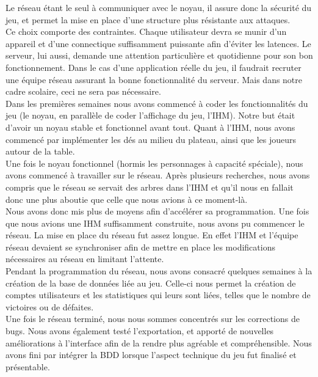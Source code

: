\documentclass[a4paper,11pt]{article}
\begin{document}
\newpage

Le réseau étant le seul à communiquer avec le noyau, il assure donc la sécurité du jeu, et permet la mise en place d’une structure plus résistante aux attaques. \\

Ce choix comporte des contraintes. Chaque utilisateur devra se munir d’un appareil et d’une connectique suffisamment puissante afin d’éviter les latences. Le serveur, lui aussi, demande une attention particulière et quotidienne pour son bon fonctionnement. Dans le cas d’une application réelle du jeu, il faudrait recruter une équipe réseau assurant la bonne fonctionnalité du serveur. Mais dans notre cadre scolaire, ceci ne sera pas nécessaire.  \\

Dans les premières semaines nous avons commencé à coder les fonctionnalités du jeu (le noyau, en parallèle de coder l’affichage du jeu, l’IHM). Notre but était d’avoir un noyau stable et fonctionnel avant tout. Quant à l’IHM, nous avons commencé par implémenter les dés au milieu du plateau, ainsi que les joueurs autour de la table. \\

	Une fois le noyau fonctionnel (hormis les personnages à capacité spéciale), nous avons commencé à travailler sur le réseau. Après plusieurs recherches, nous avons compris que le réseau se servait des arbres dans l’IHM et qu’il nous en fallait donc une plus aboutie que celle que nous avions à ce moment-là. \\

Nous avons donc mis plus de moyens afin d’accélérer sa programmation. Une fois que nous avions une IHM suffisamment construite, nous avons pu commencer le réseau. La mise en place du réseau fut assez longue. En effet l’IHM et l’équipe réseau devaient se synchroniser afin de mettre en place les modifications nécessaires au réseau en limitant l’attente. \\

Pendant la programmation du réseau, nous avons consacré quelques semaines à la création de la base de données liée au jeu. Celle-ci nous permet la création de comptes utilisateurs et les statistiques qui leurs sont liées, telles que le nombre de victoires ou de défaites. \\

	Une fois le réseau terminé, nous nous sommes concentrés sur les corrections de bugs. Nous avons également testé l’exportation, et apporté de nouvelles améliorations  à l’interface afin de la rendre plus agréable et compréhensible. Nous avons fini par intégrer la BDD lorsque l’aspect technique du jeu fut finalisé et présentable. \\ 
\end{document}
